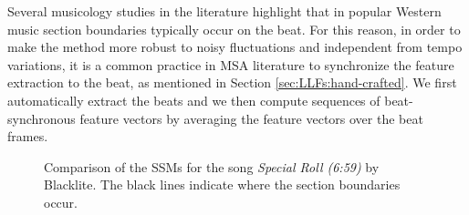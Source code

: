Several musicology studies in the literature highlight that in popular Western music section boundaries  typically occur on the beat. For this reason, in order to make the method more robust to noisy fluctuations and independent from tempo variations, it is a common practice in MSA literature \cite{Nieto2D} to synchronize the feature extraction to the beat, as mentioned in Section \ref{sec:LLFs:hand-crafted}. We first automatically extract the beats and we then compute sequences of beat-synchronous feature vectors by averaging the feature vectors over the beat frames. %

 \begin{figure}[t]
     \centering
      \hfil
     \caption{Comparison of the SSMs for the song \textit{Special Roll (6:59)} by Blacklite. The black lines indicate where the section boundaries occur.}
     \label{fig:MSA:SSM}
 \end{figure}
 

